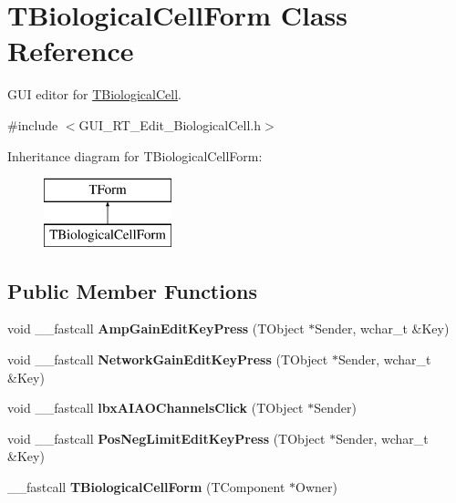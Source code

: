\hypertarget{class_t_biological_cell_form}{\section{T\+Biological\+Cell\+Form Class Reference}
\label{class_t_biological_cell_form}
}


G\+U\+I editor for \hyperlink{class_t_biological_cell}{T\+Biological\+Cell}.  




{\ttfamily \#include $<$G\+U\+I\+\_\+\+R\+T\+\_\+\+Edit\+\_\+\+Biological\+Cell.\+h$>$}

Inheritance diagram for T\+Biological\+Cell\+Form\+:\begin{figure}[H]
\begin{center}
\leavevmode
\includegraphics[height=2.000000cm]{class_t_biological_cell_form}
\end{center}
\end{figure}
\subsection*{Public Member Functions}
\begin{DoxyCompactItemize}
\item 
\hypertarget{class_t_biological_cell_form_afa19b9480377ba095705a7d98a6df242}{void \+\_\+\+\_\+fastcall {\bfseries Amp\+Gain\+Edit\+Key\+Press} (T\+Object $\ast$Sender, wchar\+\_\+t \&Key)}\label{class_t_biological_cell_form_afa19b9480377ba095705a7d98a6df242}

\item 
\hypertarget{class_t_biological_cell_form_aaf79b53ff9990460bce5ed4372ef1308}{void \+\_\+\+\_\+fastcall {\bfseries Network\+Gain\+Edit\+Key\+Press} (T\+Object $\ast$Sender, wchar\+\_\+t \&Key)}\label{class_t_biological_cell_form_aaf79b53ff9990460bce5ed4372ef1308}

\item 
\hypertarget{class_t_biological_cell_form_a6555268063a64cbab5a554f924aaee15}{void \+\_\+\+\_\+fastcall {\bfseries lbx\+A\+I\+A\+O\+Channels\+Click} (T\+Object $\ast$Sender)}\label{class_t_biological_cell_form_a6555268063a64cbab5a554f924aaee15}

\item 
\hypertarget{class_t_biological_cell_form_a0baaeb2ba369f54d62dc5d93b8c09e0c}{void \+\_\+\+\_\+fastcall {\bfseries Pos\+Neg\+Limit\+Edit\+Key\+Press} (T\+Object $\ast$Sender, wchar\+\_\+t \&Key)}\label{class_t_biological_cell_form_a0baaeb2ba369f54d62dc5d93b8c09e0c}

\item 
\hypertarget{class_t_biological_cell_form_a478835755a005cfba0a3b946c7579270}{\+\_\+\+\_\+fastcall {\bfseries T\+Biological\+Cell\+Form} (T\+Component $\ast$Owner)}\label{class_t_biological_cell_form_a478835755a005cfba0a3b946c7579270}

\end{DoxyCompactItemize}
